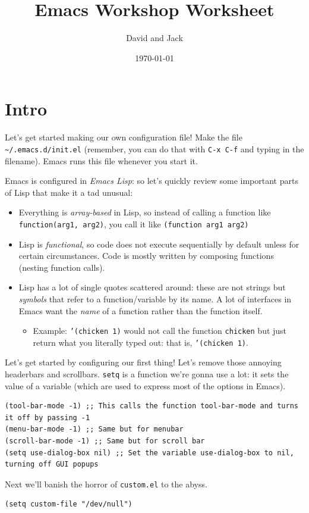 \documentclass[letterpaper]{article}
\author{David and Jack}
\date{\today}
\title{Emacs Workshop Worksheet}
\renewcommand{\tableofcontents}{}
\begin{document}
\tableofcontents


\section{Intro}
\label{sec:org7c64339}

Let's get started making our own configuration file! Make the file \texttt{\textasciitilde{}/.emacs.d/init.el} (remember, you can do that with \texttt{C-x C-f} and typing in the filename). Emacs runs this file whenever you start it.

Emacs is configured in \emph{Emacs Lisp}: so let's quickly review some important parts of Lisp that make it a tad unusual:
\begin{itemize}
\item Everything is \emph{array-based} in Lisp, so instead of calling a function like \texttt{function(arg1, arg2)}, you call it like \texttt{(function arg1 arg2)}
\item Lisp is \emph{functional}, so code does not execute sequentially by default unless for certain circumstances. Code is mostly written by composing functions (nesting function calls).
\item Lisp has a lot of single quotes scattered around: these are not strings but \emph{symbols} that refer to a function/variable by its name. A lot of interfaces in Emacs want the \emph{name} of a function rather than the function itself.
\begin{itemize}
\item Example: \texttt{'(chicken 1)} would not call the function \texttt{chicken} but just return what you literally typed out: that is, \texttt{'(chicken 1)}.
\end{itemize}
\end{itemize}

Let's get started by configuring our first thing! Let's remove those annoying headerbars and scrollbars. \texttt{setq} is a function we're gonna use a lot: it sets the value of a variable (which are used to express most of the options in Emacs). 
\begin{verbatim}
(tool-bar-mode -1) ;; This calls the function tool-bar-mode and turns it off by passing -1
(menu-bar-mode -1) ;; Same but for menubar
(scroll-bar-mode -1) ;; Same but for scroll bar
(setq use-dialog-box nil) ;; Set the variable use-dialog-box to nil, turning off GUI popups
\end{verbatim}

Next we'll banish the horror of \texttt{custom.el} to the abyss. 
\begin{verbatim}
(setq custom-file "/dev/null")
\end{verbatim}
\end{document}
